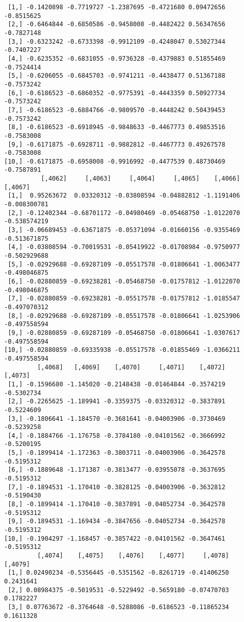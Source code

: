 \documentclass[
  letterpaper,
  DIV=11,
  numbers=noendperiod]{scrreprt}
\begin{document}
\begin{verbatim}
 [1,] -0.1420898 -0.7719727 -1.2387695 -0.4721680 0.09472656 -0.8515625
 [2,] -0.6464844 -0.6850586 -0.9458008 -0.4482422 0.56347656 -0.7827148
 [3,] -0.6323242 -0.6733398 -0.9912109 -0.4248047 0.53027344 -0.7407227
 [4,] -0.6235352 -0.6831055 -0.9736328 -0.4379883 0.51855469 -0.7524414
 [5,] -0.6206055 -0.6845703 -0.9741211 -0.4438477 0.51367188 -0.7573242
 [6,] -0.6186523 -0.6860352 -0.9775391 -0.4443359 0.50927734 -0.7573242
 [7,] -0.6186523 -0.6884766 -0.9809570 -0.4448242 0.50439453 -0.7573242
 [8,] -0.6186523 -0.6918945 -0.9848633 -0.4467773 0.49853516 -0.7583008
 [9,] -0.6171875 -0.6928711 -0.9882812 -0.4467773 0.49267578 -0.7583008
[10,] -0.6171875 -0.6958008 -0.9916992 -0.4477539 0.48730469 -0.7587891
          [,4062]     [,4063]     [,4064]     [,4065]    [,4066]      [,4067]
 [1,]  0.95263672  0.03320312 -0.03808594 -0.04882812 -1.1191406 -0.008300781
 [2,] -0.12402344 -0.68701172 -0.04980469 -0.05468750 -1.0122070 -0.538574219
 [3,] -0.06689453 -0.63671875 -0.05371094 -0.01660156 -0.9355469 -0.513671875
 [4,] -0.03808594 -0.70019531 -0.05419922 -0.01708984 -0.9750977 -0.502929688
 [5,] -0.02929688 -0.69287109 -0.05517578 -0.01806641 -1.0063477 -0.498046875
 [6,] -0.02880859 -0.69238281 -0.05468750 -0.01757812 -1.0122070 -0.498046875
 [7,] -0.02880859 -0.69238281 -0.05517578 -0.01757812 -1.0185547 -0.497070312
 [8,] -0.02929688 -0.69287109 -0.05517578 -0.01806641 -1.0253906 -0.497558594
 [9,] -0.02880859 -0.69287109 -0.05468750 -0.01806641 -1.0307617 -0.497558594
[10,] -0.02880859 -0.69335938 -0.05517578 -0.01855469 -1.0366211 -0.497558594
         [,4068]   [,4069]    [,4070]     [,4071]    [,4072]    [,4073]
 [1,] -0.1596680 -1.145020 -0.2148438 -0.01464844 -0.3574219 -0.5302734
 [2,] -0.2265625 -1.189941 -0.3359375 -0.03320312 -0.3837891 -0.5224609
 [3,] -0.1806641 -1.184570 -0.3681641 -0.04003906 -0.3730469 -0.5239258
 [4,] -0.1884766 -1.176758 -0.3784180 -0.04101562 -0.3666992 -0.5200195
 [5,] -0.1899414 -1.172363 -0.3803711 -0.04003906 -0.3642578 -0.5195312
 [6,] -0.1889648 -1.171387 -0.3813477 -0.03955078 -0.3637695 -0.5195312
 [7,] -0.1894531 -1.170410 -0.3828125 -0.04003906 -0.3632812 -0.5190430
 [8,] -0.1899414 -1.170410 -0.3837891 -0.04052734 -0.3642578 -0.5195312
 [9,] -0.1894531 -1.169434 -0.3847656 -0.04052734 -0.3642578 -0.5195312
[10,] -0.1904297 -1.168457 -0.3857422 -0.04101562 -0.3647461 -0.5195312
         [,4074]    [,4075]    [,4076]    [,4077]     [,4078]   [,4079]
 [1,] 0.02490234 -0.5356445 -0.5351562 -0.8261719 -0.41406250 0.2431641
 [2,] 0.08984375 -0.5019531 -0.5229492 -0.5659180 -0.07470703 0.1782227
 [3,] 0.07763672 -0.3764648 -0.5288086 -0.6186523 -0.11865234 0.1611328

\end{verbatim}
\end{document}
